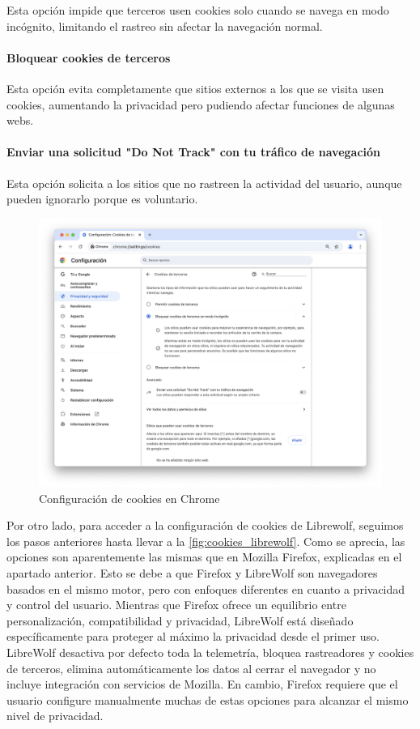 Esta opción impide que terceros usen cookies solo cuando se navega en modo incógnito, limitando el rastreo sin afectar la navegación normal. 

\paragraph{Bloquear cookies de terceros}

Esta opción evita completamente que sitios externos a los que se visita usen cookies, aumentando la privacidad pero pudiendo afectar funciones de algunas webs. 

\paragraph{Enviar una solicitud "Do Not Track" con tu tráfico de navegación }

Esta opción solicita a los sitios que no rastreen la actividad del usuario, aunque pueden ignorarlo porque es voluntario. 

\begin{figure}[H]   
    \includegraphics[width=\textwidth]{cookies_chrome_ej14a.png}
    \caption{Configuración de cookies en Chrome}
    \label{fig:cookies_chrome}
\end{figure}

Por otro lado, para acceder a la configuración de cookies de Librewolf, seguimos los pasos anteriores hasta llevar a la \ref{fig:cookies_librewolf}. Como se aprecia, las opciones son aparentemente las mismas que en Mozilla Firefox, explicadas en el apartado anterior. Esto se debe a que Firefox y LibreWolf son navegadores basados en el mismo motor, pero con enfoques diferentes en cuanto a privacidad y control del usuario. Mientras que Firefox ofrece un equilibrio entre personalización, compatibilidad y privacidad, LibreWolf está diseñado específicamente para proteger al máximo la privacidad desde el primer uso. LibreWolf desactiva por defecto toda la telemetría, bloquea rastreadores y cookies de terceros, elimina automáticamente los datos al cerrar el navegador y no incluye integración con servicios de Mozilla. En cambio, Firefox requiere que el usuario configure manualmente muchas de estas opciones para alcanzar el mismo nivel de privacidad. 

